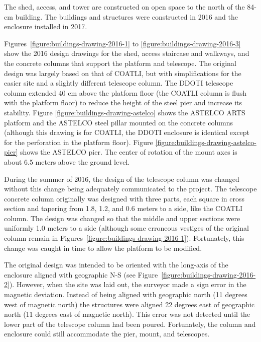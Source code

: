 \ifddoti

The shed, access, and tower are constructed on open space to the north of the 84-cm building. The buildings and structures were constructed in 2016 and the enclosure installed in 2017.

Figures~\ref{figure:buildings-drawing-2016-1} to \ref{figure:buildings-drawing-2016-3} show the 2016 design drawings for the shed, access staircase and walkways, and the concrete columns that support the platform and telescope. The original design was largely based on that of COATLI, but with simplifications for the easier site and a slightly different telescope column. The DDOTI telescope column extended 40 cm above the platform floor (the COATLI column is flush with the platform floor) to reduce the height of the steel pier and increase its stability. Figure  \ref{figure:buildings-drawing-astelco} shows the ASTELCO ARTS platform and the ASTELCO steel pillar mounted on the concrete columns (although this drawing is for COATLI, the DDOTI enclosure is identical except for the perforation in the platform floor). Figure  \ref{figure:buildings-drawing-astelco-pier} shows the ASTELCO pier. The center of rotation of the mount axes is about 6.5 meters above the ground level.

During the summer of 2016, the design of the telescope column was changed without this change being adequately communicated to the project. The telescope concrete column  originally was designed with three parts, each square in cross section and tapering from 1.8, 1.2, and 0.6 meters to a side, like the COATLI column. The design was changed so that the middle and upper sections were uniformly 1.0 meters to a side (although some erroneous vestiges of the original column remain in Figures~\ref{figure:buildings-drawing-2016-1}). Fortunately, this change was caught in time to allow the platform to be modified.

The original design was intended to be oriented with the long-axis of the enclosure aligned with geographic N-S (see Figure~\ref{figure:buildings-drawing-2016-2}). However, when the site was laid out, the surveyor made a sign error in the magnetic deviation. Instead of being aligned with geographic north (11 degrees west of magnetic north) the structures were aligned 22 degrees east of geographic north (11 degrees east of magnetic north). This error was not detected until the lower part of the telescope column had been poured. Fortunately, the column and enclosure could still accommodate the pier, mount, and telescopes.

